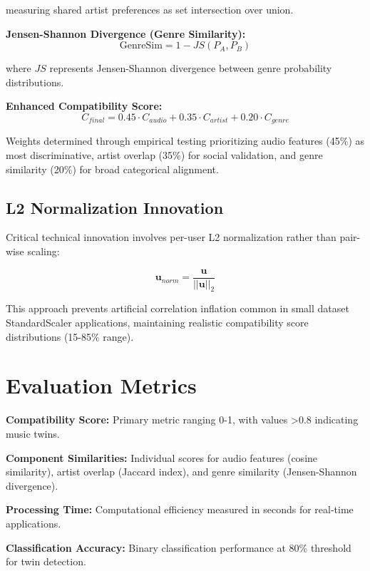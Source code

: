 \documentclass[conference]{IEEEtran}
\begin{document}
measuring shared artist preferences as set intersection over union.

\textbf{Jensen-Shannon Divergence (Genre Similarity):}
\begin{equation}
\text{GenreSim} = 1 - JS(P_A, P_B)
\end{equation}

where $JS$ represents Jensen-Shannon divergence between genre probability distributions.

\textbf{Enhanced Compatibility Score:}
\begin{equation}
C_{final} = 0.45 \cdot C_{audio} + 0.35 \cdot C_{artist} + 0.20 \cdot C_{genre}
\end{equation}

Weights determined through empirical testing prioritizing audio features (45\%) as most discriminative, artist overlap (35\%) for social validation, and genre similarity (20\%) for broad categorical alignment.

\subsection{L2 Normalization Innovation}

Critical technical innovation involves per-user L2 normalization rather than pair-wise scaling:

\begin{equation}
\mathbf{u}_{norm} = \frac{\mathbf{u}}{||\mathbf{u}||_2}
\end{equation}

This approach prevents artificial correlation inflation common in small dataset StandardScaler applications, maintaining realistic compatibility score distributions (15-85\% range).

\section{Evaluation Metrics}

\textbf{Compatibility Score:} Primary metric ranging 0-1, with values >0.8 indicating music twins.

\textbf{Component Similarities:} Individual scores for audio features (cosine similarity), artist overlap (Jaccard index), and genre similarity (Jensen-Shannon divergence).

\textbf{Processing Time:} Computational efficiency measured in seconds for real-time applications.

\textbf{Classification Accuracy:} Binary classification performance at 80\% threshold for twin detection.
\end{document}

